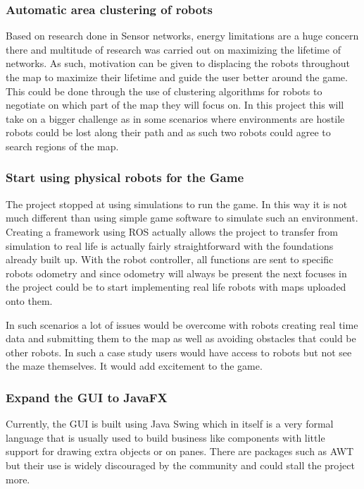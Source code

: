 \documentclass{report}
\begin{document}
      \subsubsection{Automatic area clustering of robots}
        Based on research done in Sensor networks, energy limitations are a huge concern there and multitude of research was carried out on maximizing the lifetime of networks. As such, motivation can be given to displacing the robots throughout the map to maximize their lifetime and guide the user better around the game. This could be done through the use of clustering algorithms for robots to negotiate on which part of the map they will focus on. In this project this will take on a bigger challenge as in some scenarios where environments are hostile robots could be lost along their path and as such two robots could agree to search regions of the map.

      \subsubsection{Start using physical robots for the Game}
        The project stopped at using simulations to run the game. In this way it is not much different than using simple game software to simulate such an environment. Creating a framework using ROS actually allows the project to transfer from simulation to real life is actually fairly straightforward with the foundations already built up. With the robot controller, all functions are sent to specific robots odometry and since odometry will always be present the next focuses in the project could be to start implementing real life robots with maps uploaded onto them.

        In such scenarios a lot of issues would be overcome with robots creating real time data and submitting them to the map as well as avoiding obstacles that could be other robots. In such a case study users would have access to robots but not see the maze themselves. It would add excitement to the game.

      \subsubsection{Expand the GUI to JavaFX}
        Currently, the GUI is built using Java Swing which in itself is a very formal language that is usually used to build business like components with little support for drawing extra objects or on panes. There are packages such as AWT but their use is widely discouraged by the community and could stall the project more.
\end{document}
